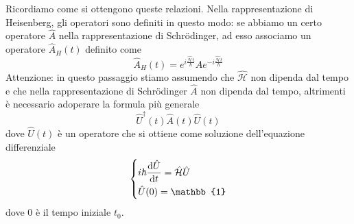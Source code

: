 \begin{soluzione}
   \vspace{0.2cm}
   Ricordiamo come si ottengono queste relazioni. Nella rappresentazione di Heisenberg, gli operatori sono definiti in questo modo: se abbiamo un certo operatore $\hat{A}$ nella rappresentazione di Schrödinger, ad esso associamo un operatore $\hat{A}_H(t)$ definito come
   \begin{equation*}
      \hat{A}_H(t)
      =e^{i\frac{\hat{\mathcal{H}} t}{\hbar}} \hat{A} e^{-i\frac{\hat{\mathcal{H}} t}{\hbar}}
   \end{equation*}
   Attenzione: in questo passaggio stiamo assumendo che $\hat{\mathcal{H}}$ non dipenda dal tempo e che nella rappresentazione di Schrödinger $\hat{A}$ non dipenda dal tempo, altrimenti è necessario adoperare la formula più generale
   \begin{equation*}
      \hat{U}^{\dag}(t) \hat{A}(t) \hat{U}(t)
   \end{equation*}
   dove $\hat{U}(t)$ è un operatore che si ottiene come soluzione dell'equazione differenziale
   \begin{equation*}
      \begin{dcases}
         i\hbar \dv{\hat{U}}{t}=\hat{\mathcal{H}}\hat{U}\\
         \hat{U}(0)=\mathbb{1}
      \end{dcases}
   \end{equation*}
   dove 0 è il tempo iniziale $t_0$.


\end{soluzione}

